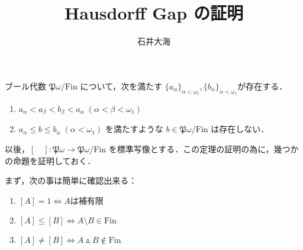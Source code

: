 \documentclass[a4j,lualatex,ja=standard]{bxjsarticle}
\title{Hausdorff Gap の証明}
\author{石井大海}
\begin{document}
\maketitle

\begin{theorem}[Hausdorff]
 ブール代数 $\mathfrak{P}\omega / \mathrm{Fin}$ について，次を満たす $\{a_\alpha\}_{\alpha < \omega_1}, \{b_\alpha\}_{\alpha < \omega_1}$が存在する．
 \begin{enumerate}
  \item $a_\alpha < a_\beta < b_\beta < a_\alpha\; (\alpha < \beta < \omega_1)$
  \item $a_\alpha \leq b \leq b_\alpha \; (\alpha < \omega_1)$ を満たすような $b \in \mathfrak{P}\omega / \mathrm{Fin}$ は存在しない．
 \end{enumerate}
\end{theorem}

以後，$[\quad]: \mathfrak{P}\omega \to \mathfrak{P}\omega/\mathrm{Fin}$ を標準写像とする．この定理の証明の為に，幾つかの命題を証明しておく．

まず，次の事は簡単に確認出来る：

\begin{fact}
 \begin{enumerate}[label=(\roman*)]
  \item $[A] = 1 \Leftrightarrow A \text{は補有限}$
  \item $[A] \leq [B] \Leftrightarrow A \setminus B \in \mathrm{Fin}$
  \item $[A] \neq [B] \Leftrightarrow A \vartriangle B \notin \mathrm{Fin}$
 \end{enumerate}
\end{fact}
\end{document}
